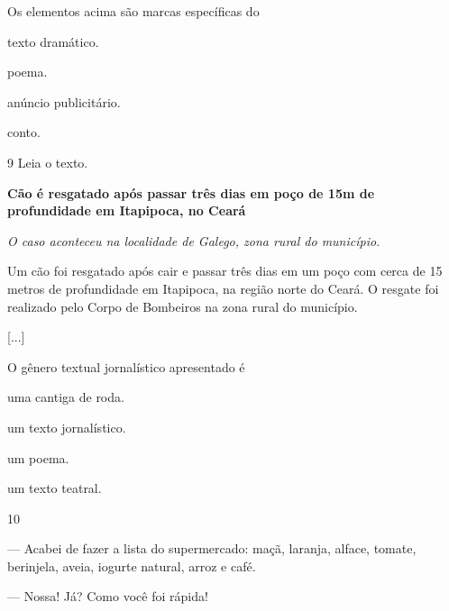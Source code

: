 Os elementos acima são marcas específicas do

\begin{escolha}
\begin{multicols}{2}
\item texto dramático.

\item poema.

\item anúncio publicitário.

\item conto.
\end{multicols}
\end{escolha}

\num{9} Leia o texto.

\begin{myquote}
\textbf{Cão é resgatado após passar três dias em poço de 15m de profundidade em Itapipoca, no Ceará}

\emph{O caso aconteceu na localidade de Galego, zona rural do município.}

Um cão foi resgatado após cair e passar três dias em um poço com cerca
de 15 metros de profundidade em Itapipoca, na região norte do Ceará. 
O resgate foi realizado pelo Corpo de Bombeiros na zona rural do município.

{[}...{]}

\end{myquote}

O gênero textual jornalístico apresentado é

\begin{escolha}
\item uma cantiga de roda.

\item um texto jornalístico.

\item um poema.

\item um texto teatral.
\end{escolha}

\num{10}

\begin{myquote}
\textit{ }

--- Acabei de fazer a lista do supermercado: maçã, laranja, alface,
tomate, berinjela, aveia, iogurte natural, arroz e café.

--- Nossa! Já? Como você foi rápida!
\end{myquote}

